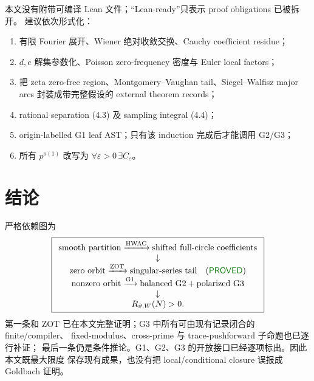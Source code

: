 \documentclass[11pt,a4paper]{ctexart}
\theoremstyle{definition}
\newcommand{\1}{\mathbf 1}
\newcommand{\PROVED}{\textcolor{green!45!black}{\textsf{PROVED}}}
\begin{document}
本文没有附带可编译 Lean 文件；“Lean-ready”只表示 proof obligations 已被拆开。
建议依次形式化：
\begin{enumerate}
\item 有限 Fourier 展开、Wiener 绝对收敛交换、Cauchy coefficient residue；
\item $d,e$ 解集参数化、Poisson zero-frequency 密度与 Euler local factors；
\item 把 zeta zero-free region、Montgomery--Vaughan tail、Siegel--Walfisz
major arcs 封装成带完整假设的 external theorem records；
\item rational separation (4.3) 及 sampling integral (4.4)；
\item origin-labelled G1 leaf AST；只有该 induction 完成后才能调用 G2/G3；
\item 所有 $p^{o(1)}$ 改写为 $\forall\varepsilon>0\,\exists C_\varepsilon$。
\end{enumerate}

\section{结论}

严格依赖图为
\[
\boxed{
\begin{array}{c}
\text{smooth partition}\xrightarrow{\rm HWAC}
\text{shifted full-circle coefficients}\\
\downarrow\\
\text{zero orbit}\xrightarrow{\rm ZOT}
\text{singular-series tail}\quad(\PROVED)\\
\text{nonzero orbit}\xrightarrow{\rm G1}
\text{balanced G2}+\text{polarized G3}\\
\downarrow\\
R_{\vartheta,W}(N)>0.
\end{array}}
\]
第一条和 ZOT 已在本文完整证明；G3 中所有可由现有记录闭合的 finite/compiler、
fixed-modulus、cross-prime 与 trace-pushforward 子命题也已逐行补证；
最后一条仍是条件推论。G1、G2、G3 的开放接口已经逐项标出。因此本文既最大限度
保存现有成果，也没有把 local/conditional closure 误报成 Goldbach 证明。
\end{document}
